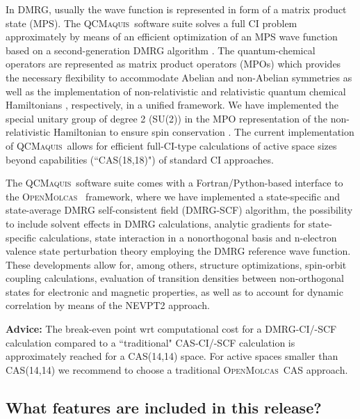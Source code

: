 \documentclass[bibliography=totoc,12pt,a4paper]{scrartcl}
\newcommand{\mol}{\textsc{OpenMolcas}}
\newcommand{\qcm}{\textsc{QCMaquis}}
\begin{document}
In DMRG, usually the wave function is represented in form of a matrix product state
(MPS). The \qcm\ software suite solves a full CI problem approximately by means of
an efficient optimization of an MPS wave function based on a second-generation DMRG algorithm \cite{Keller_JChemPhys_efficient_2015}.
The quantum-chemical operators are represented as matrix product operators (MPOs) which provides the necessary flexibility to accommodate Abelian and non-Abelian symmetries as well as the implementation of non-relativistic and relativistic quantum chemical Hamiltonians \cite{maquis-rel}, respectively,
in a unified framework. We have implemented the special unitary group of degree 2 (SU(2)) in the MPO representation of the non-relativistic Hamiltonian to ensure
spin conservation \cite{Keller_JChemPhys_Spinadapted_2016}.
The current implementation of \qcm\ allows for efficient full-CI-type calculations of active space sizes beyond capabilities (``CAS(18,18)") of standard CI approaches.

The \qcm\ software suite comes with a Fortran/Python-based interface \cite{interface} to the \mol\ \cite{Aquilante_JComputChem_Molcas_2016} framework, where we have implemented a state-specific and state-average DMRG self-consistent field (DMRG-SCF) algorithm, the possibility to include solvent effects in DMRG calculations, analytic gradients for state-specific calculations, state interaction in a nonorthogonal basis\cite{Knecht_JChemTheoryComput_nonorthogonal_2016} and n-electron valence state perturbation theory employing the DMRG reference wave function.\cite{Freitag_JChemTheoryComput_Multireference_2017} These developments allow for, among others, structure optimizations, spin-orbit coupling calculations, evaluation of transition densities between non-orthogonal states for electronic and magnetic properties, as well as to account for dynamic correlation by means of the NEVPT2 approach.

\begin{framed}
	\large{\textbf{Advice:} The break-even point wrt computational cost for a DMRG-CI/-SCF calculation compared to a ``traditional" CAS-CI/-SCF calculation is approximately reached for a CAS(14,14) space. For active spaces smaller than CAS(14,14) we recommend to choose a traditional \mol\ CAS approach.}
\end{framed}

\subsection{What features are included in this release?}\label{sec:features-v1.0}
\end{document}

